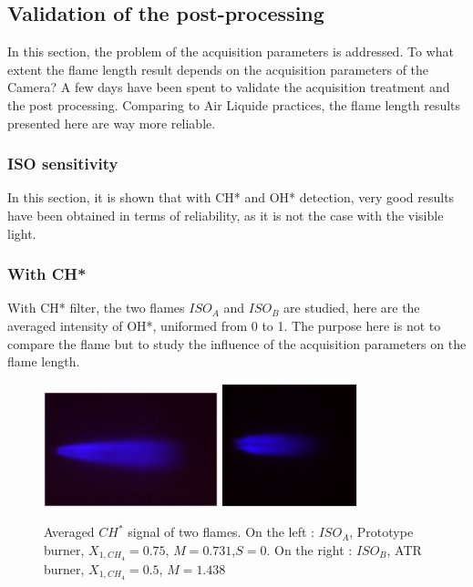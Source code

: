 \subsection{Validation of the post-processing}
In this section, the problem of the acquisition parameters is addressed. To what extent the flame length result depends on the acquisition parameters of the Camera? A few days have been spent to validate the acquisition treatment and the post processing. Comparing to Air Liquide practices, the flame length results presented here are way more reliable.  
\subsubsection{ISO sensitivity}
In this section, it is shown that with CH* and OH* detection, very good results have been obtained in terms of reliability, as it is not the case with the visible light.
\subsubsection{With CH*}
 
 With CH* filter, the two flames $ISO_{A} $ and $ISO_{B}$ are studied, here are the averaged intensity of OH*, uniformed from 0 to 1.  The purpose here is not to compare the flame but to study the influence of the acquisition parameters on the flame length.
 
 \begin{figure}[!h]
  \centering
\includegraphics[width=0.45\textwidth]{fig/sensitivity/brute_4069.eps}
\includegraphics[width=0.35\textwidth]{fig/sensitivity/brute_4476.eps}
  \caption{Averaged $CH^*$ signal of two flames. On the left : $ISO_{A}$, Prototype burner, $X_{1,CH_{4}}=0.75$, $M =0.731$,$S=0$. On the right : $ISO_{B}$, ATR burner, $X_{1,CH_{4}}=0.5$, $M = 1.438$}
 \label{fig_ISO_brute}
\end{figure}
 

